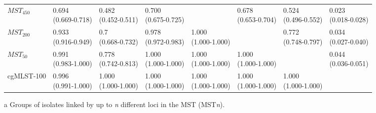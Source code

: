 \begin{table}[h!]
{\begin{threeparttable}[b]
\begin{tabular}{@{}llllllll@{}}
        $MST_{450}$\tnote{a} & \Centerstack{0.694 \\ (0.669-0.718)} & \Centerstack{0.482 \\ (0.452-0.511)} & \Centerstack{0.700 \\ (0.675-0.725)} & & \Centerstack{0.678 \\ (0.653-0.704)} & \Centerstack{0.524 \\ (0.496-0.552)} & \Centerstack{0.023 \\ (0.018-0.028)} \\
        $MST_{200}$\tnote{a} & \Centerstack{0.933 \\ (0.916-0.949)} & \Centerstack{0.7 \\ (0.668-0.732)} & \Centerstack{0.978 \\ (0.972-0.983)} & \Centerstack{1.000 \\ (1.000-1.000)} & & \Centerstack{0.772 \\ (0.748-0.797)} & \Centerstack{0.034 \\ (0.027-0.040)} \\
        $MST_{50}$\tnote{a} & \Centerstack{0.991 \\ (0.983-1.000)} & \Centerstack{0.778 \\ (0.742-0.813)} & \Centerstack{1.000 \\ (1.000-1.000)} & \Centerstack{1.000 \\ (1.000-1.000)} & \Centerstack{1.000 \\ (1.000-1.000)} & & \Centerstack{0.044 \\ (0.036-0.051)} \\
        cgMLST-100 & \Centerstack{0.996 \\ (0.991-1.000)} & \Centerstack{1.000 \\ (1.000-1.000)} & \Centerstack{1.000 \\ (1.000-1.000)} & \Centerstack{1.000 \\ (1.000-1.000)} & \Centerstack{1.000 \\ (1.000-1.000)} & \Centerstack{1.000 \\ (1.000-1.000)} & \\
        \bottomrule
    \end{tabular}
    \begin{tablenotes}
       \item [a] {\footnotesize Groups of isolates linked by up to \textit{n} different loci in the MST (MST\textit{n}).}
    \end{tablenotes}
    \end{threeparttable}
    }
\end{table}
